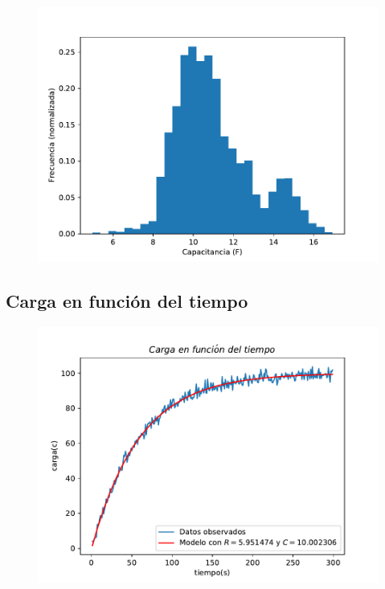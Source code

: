 \documentclass[12pt,letterpaper]{article}
\begin{document}
\begin{figure}[H]
\includegraphics{c_hist.pdf}
\centering
\end{figure}

\subsection*{Carga en función del tiempo}
\begin{figure}[H]
\includegraphics{carga.pdf}
\centering
\end{figure}

\vspace{0.3cm}
\end{document}
